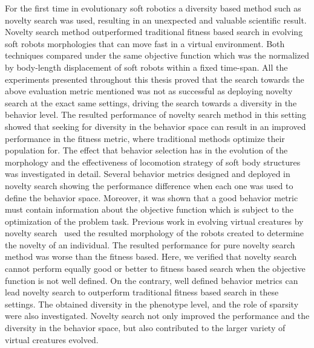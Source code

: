 For the first time in evolutionary soft robotics a diversity based method such as novelty search was used, resulting in an unexpected and valuable scientific result. Novelty search method outperformed traditional fitness based search in evolving soft robots morphologies that can move fast in a virtual environment.
Both techniques compared under the same objective function which was the normalized by body-length displacement of soft robots within a fixed time-span. All the experiments presented throughout this thesis proved that the search towards the above evaluation metric mentioned was not as successful as deploying novelty search at the exact same settings, driving the search towards a diversity in the behavior level. The resulted performance of novelty search method in this setting showed that seeking for diversity in the behavior space can result in an improved performance in the fitness metric, where traditional methods optimize their population for. The effect that behavior selection has in the evolution of the morphology and the effectiveness of locomotion strategy of soft body structures was investigated in detail. Several behavior metrics designed and deployed in novelty search showing the performance difference when each one was used to define the behavior space. Moreover, it was shown that a good behavior metric must contain information about the objective function which is subject to the optimization of the problem task. Previous work in evolving virtual creatures by novelty search~\citep{lehman2011evolving} used the resulted morphology of the robots created to determine the novelty of an individual. The resulted performance for pure novelty search method was worse than the fitness based. Here, we verified that novelty search cannot perform equally good or better to fitness based search when the objective function is not well defined. On the contrary, well defined behavior metrics can lead novelty search to outperform traditional fitness based search in these settings. The obtained diversity in the phenotype level, and the role of sparsity were also investigated. Novelty search not only improved the performance and the diversity in the behavior space, but also contributed to the larger variety of virtual creatures evolved. 


